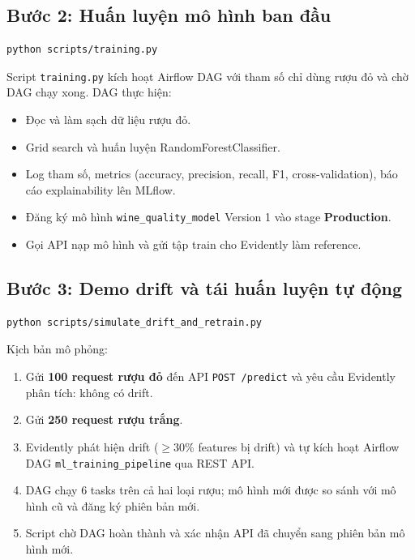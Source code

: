 \documentclass[12pt,a4paper]{report}
\begin{document}
\subsection{Bước 2: Huấn luyện mô hình ban đầu}

\begin{lstlisting}[language=bash, caption=Huấn luyện mô hình lần đầu]
python scripts/training.py
\end{lstlisting}

Script \texttt{training.py} kích hoạt Airflow DAG với tham số chỉ dùng rượu đỏ và chờ DAG chạy xong. DAG thực hiện:
\begin{itemize}
  \item Đọc và làm sạch dữ liệu rượu đỏ.
  \item Grid search và huấn luyện RandomForestClassifier.
  \item Log tham số, metrics (accuracy, precision, recall, F1, cross-validation), báo cáo explainability lên MLflow.
  \item Đăng ký mô hình \texttt{wine\_quality\_model} Version 1 vào stage \textbf{Production}.
  \item Gọi API nạp mô hình và gửi tập train cho Evidently làm reference.
\end{itemize}

\subsection{Bước 3: Demo drift và tái huấn luyện tự động}

\begin{lstlisting}[language=bash, caption=Chạy demo data drift]
python scripts/simulate_drift_and_retrain.py
\end{lstlisting}

Kịch bản mô phỏng:
\begin{enumerate}
  \item Gửi \textbf{100 request rượu đỏ} đến API \texttt{POST /predict} và yêu cầu Evidently phân tích: không có drift.
  \item Gửi \textbf{250 request rượu trắng}.
  \item Evidently phát hiện drift ($\geq$30\% features bị drift) và tự kích hoạt Airflow DAG \texttt{ml\_training\_pipeline} qua REST API.
  \item DAG chạy 6 tasks trên cả hai loại rượu; mô hình mới được so sánh với mô hình cũ và đăng ký phiên bản mới.
  \item Script chờ DAG hoàn thành và xác nhận API đã chuyển sang phiên bản mô hình mới.
\end{enumerate}
\end{document}
